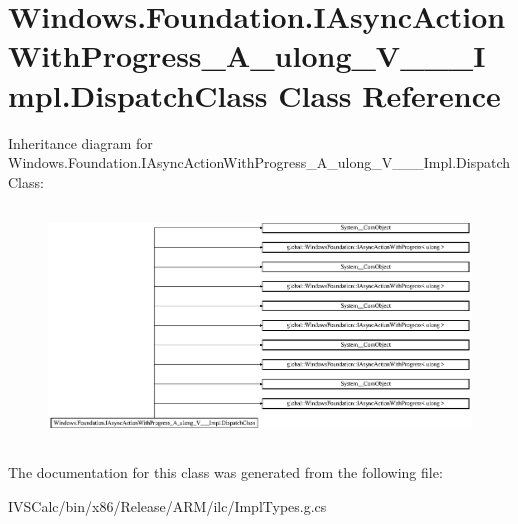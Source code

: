 \hypertarget{class_windows_1_1_foundation_1_1_i_async_action_with_progress___a__ulong___v_______impl_1_1_dispatch_class}{}\section{Windows.\+Foundation.\+I\+Async\+Action\+With\+Progress\+\_\+\+A\+\_\+ulong\+\_\+\+V\+\_\+\+\_\+\+\_\+\+Impl.\+Dispatch\+Class Class Reference}
\label{class_windows_1_1_foundation_1_1_i_async_action_with_progress___a__ulong___v_______impl_1_1_dispatch_class}
Inheritance diagram for Windows.\+Foundation.\+I\+Async\+Action\+With\+Progress\+\_\+\+A\+\_\+ulong\+\_\+\+V\+\_\+\+\_\+\+\_\+\+Impl.\+Dispatch\+Class\+:\begin{figure}[H]
\begin{center}
\leavevmode
\includegraphics[height=6.311476cm]{class_windows_1_1_foundation_1_1_i_async_action_with_progress___a__ulong___v_______impl_1_1_dispatch_class}
\end{center}
\end{figure}


The documentation for this class was generated from the following file\+:\begin{DoxyCompactItemize}
\item 
I\+V\+S\+Calc/bin/x86/\+Release/\+A\+R\+M/ilc/Impl\+Types.\+g.\+cs\end{DoxyCompactItemize}

